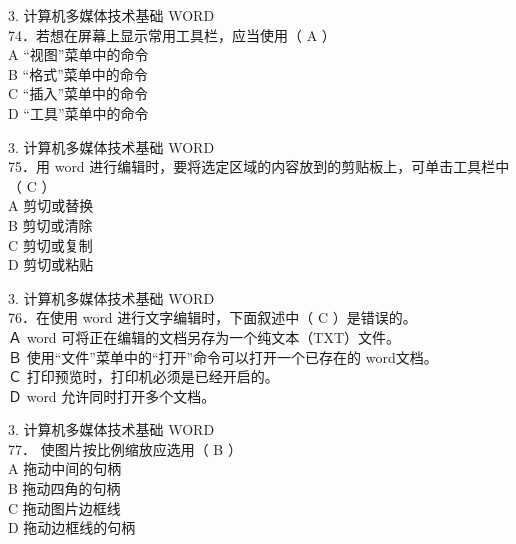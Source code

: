 \documentclass[aspectratio=169]{beamer}
\begin{document}
\begin{frame}[t]{3. 计算机多媒体技术基础} \vspace{20pt}
    WORD\\
74．若想在屏幕上显示常用工具栏，应当使用（ A ）\\
A “视图”菜单中的命令\\ B “格式”菜单中的命令\\
C “插入”菜单中的命令\\ D “工具”菜单中的命令\\
\end{frame}




\begin{frame}[t]{3. 计算机多媒体技术基础} \vspace{20pt}
    WORD\\

75．用 word 进行编辑时，要将选定区域的内容放到的剪贴板上，可单击工具栏中（ C ）\\
A 剪切或替换\\ B 剪切或清除\\ C 剪切或复制\\ D 剪切或粘贴\\
\end{frame}


\begin{frame}[t]{3. 计算机多媒体技术基础} \vspace{20pt}
    WORD\\
76．在使用 word 进行文字编辑时，下面叙述中（ C ）是错误的。\\
Ａ word 可将正在编辑的文档另存为一个纯文本（TXT）文件。\\
Ｂ 使用“文件”菜单中的“打开”命令可以打开一个已存在的 word文档。\\
Ｃ 打印预览时，打印机必须是已经开启的。\\
Ｄ word 允许同时打开多个文档。\\
\end{frame}

\begin{frame}[t]{3. 计算机多媒体技术基础} \vspace{20pt}
    WORD\\
77． 使图片按比例缩放应选用（ B ）\\
A 拖动中间的句柄\\ B 拖动四角的句柄\\
C 拖动图片边框线\\ D 拖动边框线的句柄\\
\end{frame}
\end{document}

